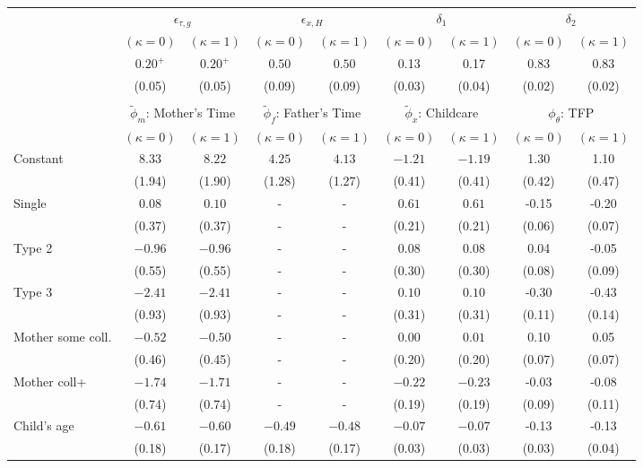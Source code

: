 \begin{tabular}{lcccccccc}\\\toprule
 & \multicolumn{2}{c}{$\epsilon_{\tau,g}$} & \multicolumn{2}{c}{$\epsilon_{x,H}$} & \multicolumn{2}{c}{$\delta_{1}$} & \multicolumn{2}{c}{$\delta_{2}$} \\
& $(\kappa=0)$ & $(\kappa=1)$ & $(\kappa=0)$ & $(\kappa=1)$ & $(\kappa=0)$ & $(\kappa=1)$ & $(\kappa=0)$ & $(\kappa=1)$ \\\cmidrule(r){2-3}\cmidrule(r){4-5}\cmidrule(r){6-7}\cmidrule(r){8-9}
&$0.20^{+}$&$0.20^{+}$&$0.50$&$0.50$&0.13&0.17&0.83&0.83\\
&(0.05)&(0.05)&(0.09)&(0.09)&(0.03)&(0.04)&(0.02)&(0.02)\\
&&&&&&&&\\
 & \multicolumn{2}{c}{$\tilde{\phi}_{m}$: Mother's Time} & \multicolumn{2}{c}{$\tilde{\phi}_{f}$: Father's Time} & \multicolumn{2}{c}{$\tilde{\phi}_{x}$: Childcare} & \multicolumn{2}{c}{$\phi_{\theta}$: TFP} \\
& $(\kappa=0)$ & $(\kappa=1)$ & $(\kappa=0)$ & $(\kappa=1)$ & $(\kappa=0)$ & $(\kappa=1)$ & $(\kappa=0)$ & $(\kappa=1)$ \\\cmidrule(r){2-3}\cmidrule(r){4-5}\cmidrule(r){6-7}\cmidrule(r){8-9}
Constant&$8.33$&$8.22$&$4.25$&$4.13$&$-1.21$&$-1.19$&1.30&1.10\\
&(1.94)&(1.90)&(1.28)&(1.27)&(0.41)&(0.41)&(0.42)&(0.47)\\
Single&$0.08$&$0.10$&-&-&$0.61$&$0.61$&-0.15&-0.20\\
&(0.37)&(0.37)&-&-&(0.21)&(0.21)&(0.06)&(0.07)\\
Type 2&$-0.96$&$-0.96$&-&-&$0.08$&$0.08$&0.04&-0.05\\
&(0.55)&(0.55)&-&-&(0.30)&(0.30)&(0.08)&(0.09)\\
Type 3&$-2.41$&$-2.41$&-&-&$0.10$&$0.10$&-0.30&-0.43\\
&(0.93)&(0.93)&-&-&(0.31)&(0.31)&(0.11)&(0.14)\\
Mother some coll.&$-0.52$&$-0.50$&-&-&$0.00$&$0.01$&0.10&0.05\\
&(0.46)&(0.45)&-&-&(0.20)&(0.20)&(0.07)&(0.07)\\
Mother coll+&$-1.74$&$-1.71$&-&-&$-0.22$&$-0.23$&-0.03&-0.08\\
&(0.74)&(0.74)&-&-&(0.19)&(0.19)&(0.09)&(0.11)\\
Child's age&$-0.61$&$-0.60$&$-0.49$&$-0.48$&$-0.07$&$-0.07$&-0.13&-0.13\\
&(0.18)&(0.17)&(0.18)&(0.17)&(0.03)&(0.03)&(0.03)&(0.04)\\

\end{tabular}
